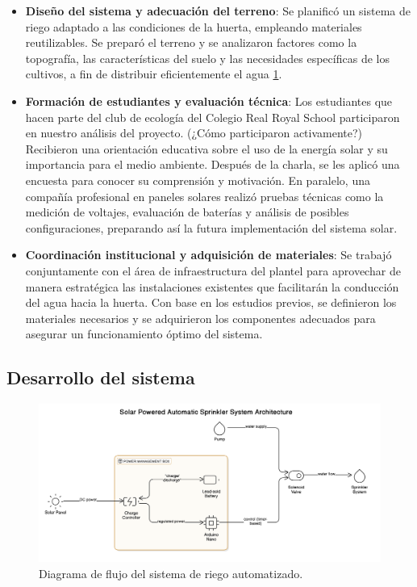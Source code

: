 \documentclass[12pt]{article}
\begin{document}
\begin{itemize}
      \item \textbf{Diseño del sistema y adecuación del terreno}: Se planificó un sistema de riego adaptado a las condiciones de la huerta, empleando materiales reutilizables. Se preparó el terreno y se analizaron factores como la topografía, las características del suelo y las necesidades específicas de los cultivos, a fin de distribuir eficientemente el agua \ref{fig:diagrama}.
      \item \textbf{Formación de estudiantes y evaluación técnica}: Los estudiantes que hacen parte del club de ecología del Colegio Real Royal School participaron en nuestro análisis del proyecto. (¿Cómo participaron activamente?) Recibieron una orientación educativa sobre el uso de la energía solar y su importancia para el medio ambiente. Después de la charla, se les aplicó una encuesta para conocer su comprensión y motivación. En paralelo, una compañía profesional en paneles solares realizó pruebas técnicas como la medición de voltajes, evaluación de baterías y análisis de posibles configuraciones, preparando así la futura implementación del sistema solar.
      \item \textbf{Coordinación institucional y adquisición de materiales}: Se trabajó conjuntamente con el área de infraestructura del plantel para aprovechar de manera estratégica las instalaciones existentes que facilitarán la conducción del agua hacia la huerta. Con base en los estudios previos, se definieron los materiales necesarios y se adquirieron los componentes adecuados para asegurar un funcionamiento óptimo del sistema.
\end{itemize}




\subsection{Desarrollo del sistema}

\begin{figure}[htbp]
      \centering
      \includegraphics[width=1\textwidth]{imagenes/diagram.png}
      \caption{Diagrama de flujo del sistema de riego automatizado.}
      \label{fig:diagrama}
\end{figure}
\end{document}
